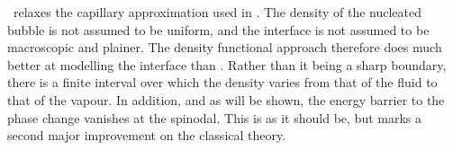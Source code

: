 \Dft\ relaxes the capillary approximation used in \cnt.
The density of the nucleated bubble is not assumed to be uniform,
and the interface is not assumed to be macroscopic and plainer\cite{Oxtoby1992, Oxtoby1988}.
The density functional approach therefore does much better at modelling the interface than \cnt.
Rather than it being a sharp boundary,
there is a finite interval over which the density varies from that of the fluid to that of the vapour.
In addition, and as will be shown, the energy barrier to the phase change vanishes at the spinodal.
This is as it should be, but marks a second major improvement on the classical theory\cite{Talanquer1997}.






%  

